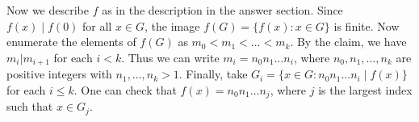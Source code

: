 Now we describe $f$ as in the description in the answer section.
Since $f(x) \mid f(0)$ for all $x \in G$, the image $f(G) = \{f(x) : x \in G\}$ is finite.
Now enumerate the elements of $f(G)$ as $m_0 < m_1 < \ldots < m_k$.
By the claim, we have $m_i | m_{i + 1}$ for each $i < k$.
Thus we can write $m_i = n_0 n_1 \ldots n_i$, where $n_0, n_1, \ldots, n_k$ are positive integers with $n_1, \ldots, n_k > 1$.
Finally, take $G_i = \{x \in G : n_0 n_1 \ldots n_i \mid f(x)\}$ for each $i \leq k$.
One can check that $f(x) = n_0 n_1 \ldots n_j$, where $j$ is the largest index such that $x \in G_j$.
